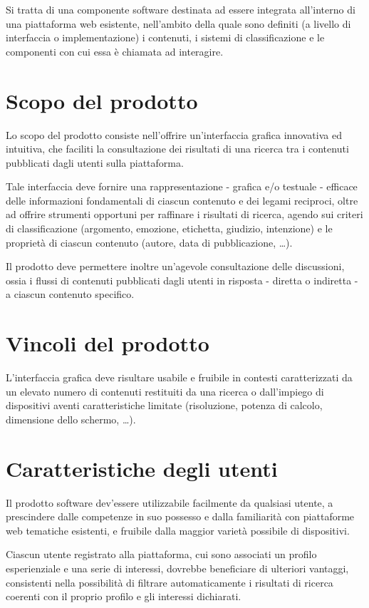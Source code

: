\documentclass[10pt,a4paper,headinclude,footinclude,hidelinks]{scrreprt} %
\begin{document}
	Si tratta di una componente software destinata ad essere integrata all'interno di una piattaforma web esistente, nell'ambito della quale sono definiti (a livello di interfaccia o implementazione) i contenuti, i sistemi di classificazione e le componenti con cui essa è chiamata ad interagire.

	\section{Scopo del prodotto}
	\label{sec:stage:ar:intro:scopo}
	Lo scopo del prodotto consiste nell'offrire un'interfaccia grafica innovativa ed intuitiva, che faciliti la consultazione dei risultati di una ricerca tra i contenuti pubblicati dagli utenti sulla piattaforma.

	Tale interfaccia deve fornire una rappresentazione - grafica e/o testuale - efficace delle informazioni fondamentali di ciascun contenuto e dei legami reciproci, oltre ad offrire strumenti opportuni per raffinare i risultati di ricerca, agendo sui criteri di classificazione (argomento, emozione, etichetta, giudizio, intenzione) e le proprietà di ciascun contenuto (autore, data di pubblicazione, \ldots).

	Il prodotto deve permettere inoltre un'agevole consultazione delle discussioni, ossia i flussi di contenuti pubblicati dagli utenti in risposta - diretta o indiretta - a ciascun contenuto specifico.

	\section{Vincoli del prodotto}
	\label{sec:stage:ar:intro:vincoli}
	L'interfaccia grafica deve risultare usabile e fruibile in contesti caratterizzati da un elevato numero di contenuti restituiti da una ricerca o dall'impiego di dispositivi aventi caratteristiche limitate (risoluzione, potenza di calcolo, dimensione dello schermo, \ldots).

	\section{Caratteristiche degli utenti}
	\label{sec:stage:ar:intro:utenti}
	Il prodotto software dev'essere utilizzabile facilmente da qualsiasi utente, a prescindere dalle competenze in suo possesso e dalla familiarità con piattaforme web tematiche esistenti, e fruibile dalla maggior varietà possibile di dispositivi.

	Ciascun utente registrato alla piattaforma, cui sono associati un profilo esperienziale e una serie di interessi, dovrebbe beneficiare di ulteriori vantaggi, consistenti nella possibilità di filtrare automaticamente i risultati di ricerca coerenti con il proprio profilo e gli interessi dichiarati.
\end{document}
